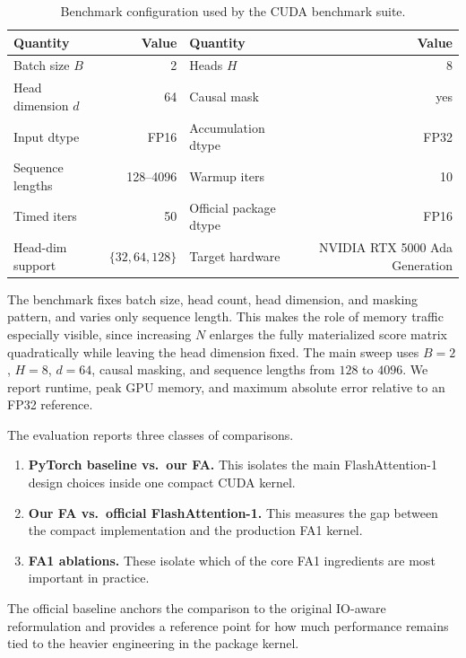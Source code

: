\documentclass{article}
\begin{document}
\begin{table}[H]
    \centering
    \small
    \caption{Benchmark configuration used by the CUDA benchmark suite.}
    \label{tab:benchcfg}
    \begin{tabular}{lr|lr}
        \toprule
        Quantity & Value & Quantity & Value \\
        \midrule
        Batch size $B$ & 2 & Heads $H$ & 8 \\
        Head dimension $d$ & 64 & Causal mask & yes \\
        Input dtype & FP16 & Accumulation dtype & FP32 \\
        Sequence lengths & 128--4096 & Warmup iters & 10 \\
        Timed iters & 50 & Official package dtype & FP16 \\
        Head-dim support & $\{32, 64, 128\}$ & Target hardware & NVIDIA RTX 5000 Ada Generation  \\
        \bottomrule
    \end{tabular}
\end{table}

The benchmark fixes batch size, head count, head dimension, and masking pattern, and varies only sequence length. This makes the role of memory traffic especially visible, since increasing $N$ enlarges the fully materialized score matrix quadratically while leaving the head dimension fixed. The main sweep uses $B=2$, $H=8$, $d=64$, causal masking, and sequence lengths from $128$ to $4096$. We report runtime, peak GPU memory, and maximum absolute error relative to an FP32 reference.

The evaluation reports three classes of comparisons.
\begin{enumerate}
    \item \textbf{PyTorch baseline vs.\ our FA.} This isolates the main FlashAttention-1 design choices inside one compact CUDA kernel.
    \item \textbf{Our FA vs.\ official FlashAttention-1.} This measures the gap between the compact implementation and the production FA1 kernel.
    \item \textbf{FA1 ablations.} These isolate which of the core FA1 ingredients are most important in practice.
\end{enumerate}

The official baseline anchors the comparison to the original IO-aware reformulation and provides a reference point for how much performance remains tied to the heavier engineering in the package kernel.
\end{document}
